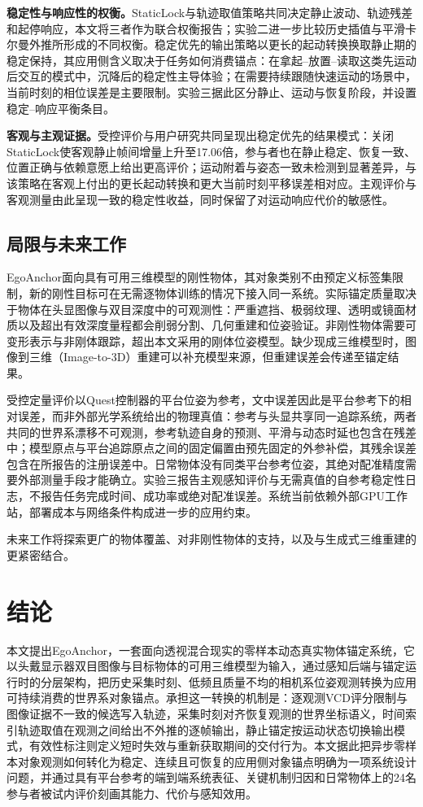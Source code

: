 \documentclass[review]{vgtc}
\begin{document}
\textbf{稳定性与响应性的权衡。}StaticLock与轨迹取值策略共同决定静止波动、轨迹残差和起停响应，本文将三者作为联合权衡报告；实验二进一步比较历史插值与平滑卡尔曼外推所形成的不同权衡。稳定优先的输出策略以更长的起动转换换取静止期的稳定保持，其应用侧含义取决于任务如何消费锚点：在拿起--放置--读取这类先运动后交互的模式中，沉降后的稳定性主导体验；在需要持续跟随快速运动的场景中，当前时刻的相位误差是主要限制。实验三据此区分静止、运动与恢复阶段，并设置稳定--响应平衡条目。

\textbf{客观与主观证据。}受控评价与用户研究共同呈现出稳定优先的结果模式：关闭StaticLock使客观静止帧间增量上升至17.06倍，参与者也在静止稳定、恢复一致、位置正确与依赖意愿上给出更高评价；运动附着与姿态一致未检测到显著差异，与该策略在客观上付出的更长起动转换和更大当前时刻平移误差相对应。主观评价与客观测量由此呈现一致的稳定性收益，同时保留了对运动响应代价的敏感性。

\subsection{局限与未来工作}

EgoAnchor面向具有可用三维模型的刚性物体，其对象类别不由预定义标签集限制，新的刚性目标可在无需逐物体训练的情况下接入同一系统。实际锚定质量取决于物体在头显图像与双目深度中的可观测性：严重遮挡、极弱纹理、透明或镜面材质以及超出有效深度量程都会削弱分割、几何重建和位姿验证。非刚性物体需要可变形表示与非刚体跟踪，超出本文采用的刚体位姿模型。缺少现成三维模型时，图像到三维（Image-to-3D）重建可以补充模型来源，但重建误差会传递至锚定结果。

受控定量评价以Quest控制器的平台位姿为参考，文中误差因此是平台参考下的相对误差，而非外部光学系统给出的物理真值：参考与头显共享同一追踪系统，两者共同的世界系漂移不可观测，参考轨迹自身的预测、平滑与动态时延也包含在残差中；模型原点与平台追踪原点之间的固定偏置由预先固定的外参补偿，其残余误差包含在所报告的注册误差中。日常物体没有同类平台参考位姿，其绝对配准精度需要外部测量手段才能确立。实验三报告主观感知评价与无需真值的自参考稳定性日志，不报告任务完成时间、成功率或绝对配准误差。系统当前依赖外部GPU工作站，部署成本与网络条件构成进一步的应用约束。

未来工作将探索更广的物体覆盖、对非刚性物体的支持，以及与生成式三维重建的更紧密结合。

\section{结论}\label{sec:conclusion}

本文提出EgoAnchor，一套面向透视混合现实的零样本动态真实物体锚定系统，它以头戴显示器双目图像与目标物体的可用三维模型为输入，通过感知后端与锚定运行时的分层架构，把历史采集时刻、低频且质量不均的相机系位姿观测转换为应用可持续消费的世界系对象锚点。承担这一转换的机制是：逐观测VCD评分限制与图像证据不一致的候选写入轨迹，采集时刻对齐恢复观测的世界坐标语义，时间索引轨迹取值在观测之间给出不外推的逐帧输出，静止锚定按运动状态切换输出模式，有效性标注则定义短时失效与重新获取期间的交付行为。本文据此把异步零样本对象观测如何转化为稳定、连续且可恢复的应用侧对象锚点明确为一项系统设计问题，并通过具有平台参考的端到端系统表征、关键机制归因和日常物体上的24名参与者被试内评价刻画其能力、代价与感知效用。
\end{document}
